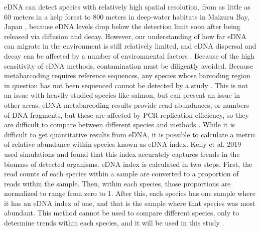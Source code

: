 \documentclass[12pt,twoside]{reedthesis}
\begin{document}
eDNA can detect species with relatively high spatial resolution, from as little as 60 meters in a kelp forest \autocite{Port2016} to 800 meters in deep-water habitats in Maizuru Bay, Japan \autocite{Yamamoto2017}, because eDNA levels drop below the detection limit soon after being released via diffusion and decay. However, our understanding of how far eDNA can migrate in the environment is still relatively limited, and eDNA dispersal and decay can be affected by a number of environmental factors \autocite{Cristescu2018}. Because of the high sensitivity of eDNA methods, contamination must be diligently avoided. Because metabarcoding requires reference sequences, any species whose barcoding region in question has not been sequenced cannot be detected by a study \autocite{Miya2022}. This is not an issue with heavily-studied species like salmon, but can present an issue in other areas. eDNA metabarcoding results provide read abundances, or numbers of DNA fragments, but these are affected by PCR replication efficiency, so they are difficult to compare between different species and methods \autocite{Miya2022}. While it is difficult to get quantitative results from eDNA, it is possible to calculate a metric of relative abundance within species known as eDNA index. Kelly et al. 2019 used simulations and found that this index accurately captures trends in the biomass of detected organisms. eDNA index is calculated in two steps. First, the read counts of each species within a sample are converted to a proportion of reads within the sample. Then, within each species, those proportions are normalized to range from zero to 1. After this, each species has one sample where it has an eDNA index of one, and that is the sample where that species was most abundant. This method cannot be used to compare different species, only to determine trends within each species, and it will be used in this study \autocite{Kelly2019}.
\end{document}
